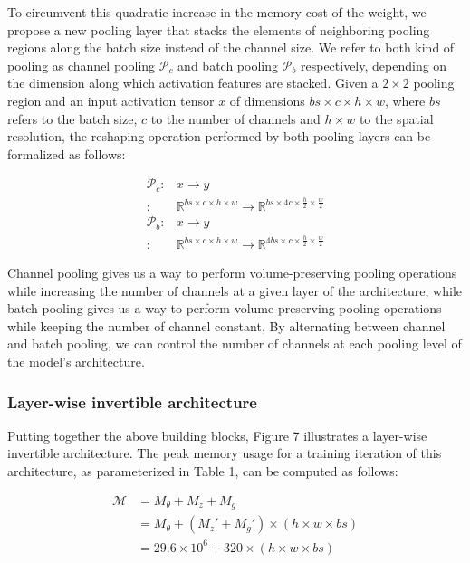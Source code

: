 \documentclass[twocolumn]{bmcart}
\begin{document}
To circumvent this quadratic increase in the memory cost of the weight,
we propose a new pooling layer that stacks the elements of neighboring pooling regions along the batch size instead of the channel size.
We refer to both kind of pooling as channel pooling $\mathcal{P}_c$ and batch pooling $\mathcal{P}_b$ respectively,
depending on the dimension along which activation features are stacked.
Given a $2 \times 2$ pooling region and an input activation tensor $x$ of dimensions $bs \times c \times h \times w$,
where $bs$ refers to the batch size, $c$ to the number of channels and $h \times w$ to the spatial resolution,
the reshaping operation performed by both pooling layers can be formalized as follows:

\begin{subequations}
\begin{align}
	\mathcal{P}_c :& x \rightarrow y \\
	              :&  \mathbb{R}^{bs \times c \times h \times w}  \rightarrow \mathbb{R}^{bs \times 4c \times \frac{h}{2} \times \frac{w}{2}}\\
	\mathcal{P}_b :& x \rightarrow y \\
                      :&  \mathbb{R}^{bs \times c \times h \times w}  \rightarrow \mathbb{R}^{4bs \times c \times \frac{h}{2} \times \frac{w}{2}}
\end{align}
\end{subequations}

Channel pooling gives us a way to perform volume-preserving pooling operations while increasing the number of channels at a given layer of the architecture,
while batch pooling gives us a way to perform volume-preserving pooling operations while keeping the number of channel constant,
By alternating between channel and batch pooling, we can control the number of channels at each pooling level of the model's architecture.

\subsubsection{Layer-wise invertible architecture}

Putting together the above building blocks, Figure 7 illustrates a layer-wise invertible architecture.
The peak memory usage for a training iteration of this architecture, as parameterized in Table 1, can be computed as follows:

\begin{subequations}
\begin{align}
\mathcal{M} &= M_{\theta} + M_{z} + M_{g} \\
            &= M_{\theta} + (M_z' + M_{g}') \times (h \times w \times bs) \\
            &= 29.6 \times 10^6 + 320 \times (h \times w \times bs)
\end{align}
\end{subequations}
\end{document}
